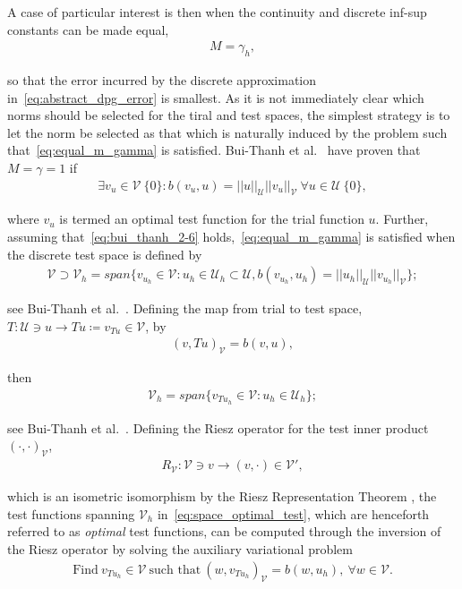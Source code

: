 A case of particular interest is then when the continuity and discrete inf-sup constants can be made equal,
\begin{align} \label{eq:equal_m_gamma}
M = \gamma_h,
\end{align}

so that the error incurred by the discrete approximation in~\eqref{eq:abstract_dpg_error} is smallest. As it is not
immediately clear which norms should be selected for the tiral and test spaces, the simplest strategy is to let the norm
be selected as that which is naturally induced by the problem such that~\eqref{eq:equal_m_gamma} is satisfied. Bui-Thanh
et al.~\cite[Theorem ]{BuiThanh2013} have proven that $M = \gamma = 1$ if
\begin{align} \label{eq:bui_thanh_2-6}
\exists v_u \in \mathcal{V}\ \{0\} : b(v_u,u) = ||u||_{\mathcal{U}} ||v_u||_{\mathcal{V}}\ \forall u \in \mathcal{U}\ \{0\},
\end{align}

where $v_u$ is termed an optimal test function for the trial function $u$. Further, assuming
that~\eqref{eq:bui_thanh_2-6} holds,~\eqref{eq:equal_m_gamma} is satisfied when the discrete test space is defined by
\begin{align}
\mathcal{V} \supset \mathcal{V}_h = span \{ v_{u_h} \in \mathcal{V} : u_h \in \mathcal{U}_h \subset \mathcal{U}, b(v_{u_h},u_h) = ||u_h||_{\mathcal{U}}
||v_{u_h}||_{\mathcal{V}} \};
\end{align}

see Bui-Thanh et al.~\cite[Lemma ]{BuiThanh2013}. Defining the map from trial to test space, $T :
\mathcal{U} \ni u \rightarrow Tu \coloneqq v_{Tu} \in \mathcal{V} $, by
\begin{align}
(v,Tu)_{\mathcal{V}} = b(v,u),
\end{align}

then
\begin{align} \label{eq:space_optimal_test}
\mathcal{V}_h = span \{ v_{T u_h} \in \mathcal{V} : u_h \in \mathcal{U}_h \};
\end{align}

see Bui-Thanh et al.~\cite[Theorem ]{BuiThanh2013}. Defining the Riesz operator for the test inner product
$(\cdot,\cdot)_{\mathcal{V}}$,
\begin{align}
R_{\mathcal{V}} : \mathcal{V} \ni v \rightarrow (v,\cdot) \in \mathcal{V}',
\end{align}

which is an isometric isomorphism by the Riesz Representation Theorem , the test functions
spanning $\mathcal{V}_h$ in~\eqref{eq:space_optimal_test}, which are henceforth referred to as \emph{optimal} test
functions, can be computed through the inversion of the Riesz operator by solving the auxiliary variational problem
\begin{align} \label{eq:bilinear_abstract_infinite}
\text{Find}\ v_{T u_h} \in \mathcal{V}\ \text{such that}\
(w,v_{T u_h})_{\mathcal{V}} = b(w,u_h),\ \forall w \in \mathcal{V}.
\end{align}

